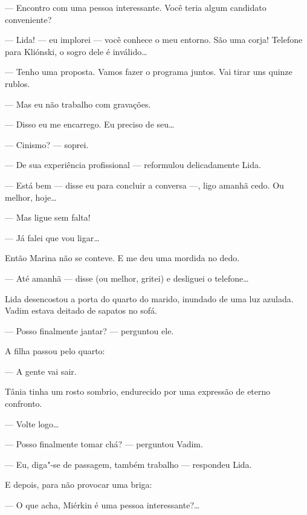 --- Encontro com uma pessoa interessante. Você teria algum candidato
conveniente?

--- Lida! --- eu implorei --- você conhece o meu entorno. São uma corja!
Telefone para Kliónski, o sogro dele é inválido\ldots{}

--- Tenho uma proposta. Vamos fazer o programa juntos. Vai tirar uns
quinze rublos.

--- Mas eu não trabalho com gravações.

--- Disso eu me encarrego. Eu preciso de seu\ldots{}

--- Cinismo? --- soprei.

--- De sua experiência profissional --- reformulou delicadamente Lida.

--- Está bem --- disse eu para concluir a conversa ---, ligo amanhã
cedo. Ou melhor, hoje\ldots{}

--- Mas ligue sem falta!

--- Já falei que vou ligar\ldots{}

Então Marina não se conteve. E me deu uma mordida no dedo.

--- Até amanhã --- disse (ou melhor, gritei) e desliguei o telefone\ldots{}

\bigskip

Lida desencostou a porta do quarto do marido, inundado de uma luz
azulada. Vadim estava deitado de sapatos no sofá.

--- Posso finalmente jantar? --- perguntou ele.

A filha passou pelo quarto:

--- A gente vai sair.

Tânia tinha um rosto sombrio, endurecido por uma expressão de eterno
confronto.

--- Volte logo\ldots{}

--- Posso finalmente tomar chá? --- perguntou Vadim.

--- Eu, diga"-se de passagem, também trabalho --- respondeu Lida.

E depois, para não provocar uma briga:

--- O que acha, Miérkin é uma pessoa interessante?\ldots{}

\movetooddpage
\begin{center}
{}
\end{center}

